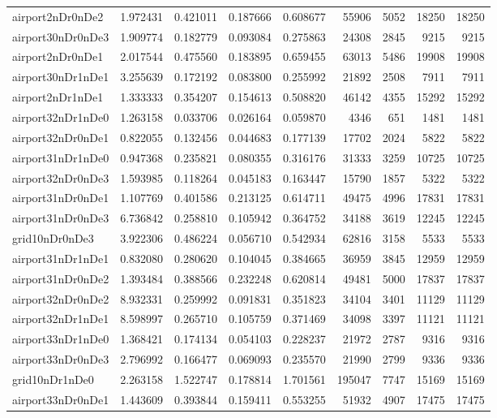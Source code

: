 \documentclass[../../../thesis.tex]{subfiles}
\begin{document}
\begin{longtable}{|l|r|r|r|r|r|r|r|r|}
airport2nDr0nDe2 & 1.972431 & 0.421011 & 0.187666 & 0.608677 & 55906 & 5052 & 18250 & 18250 \\
airport30nDr0nDe3 & 1.909774 & 0.182779 & 0.093084 & 0.275863 & 24308 & 2845 & 9215 & 9215 \\
airport2nDr0nDe1 & 2.017544 & 0.475560 & 0.183895 & 0.659455 & 63013 & 5486 & 19908 & 19908 \\
airport30nDr1nDe1 & 3.255639 & 0.172192 & 0.083800 & 0.255992 & 21892 & 2508 & 7911 & 7911 \\
airport2nDr1nDe1 & 1.333333 & 0.354207 & 0.154613 & 0.508820 & 46142 & 4355 & 15292 & 15292 \\
airport32nDr1nDe0 & 1.263158 & 0.033706 & 0.026164 & 0.059870 & 4346 & 651 & 1481 & 1481 \\
airport32nDr0nDe1 & 0.822055 & 0.132456 & 0.044683 & 0.177139 & 17702 & 2024 & 5822 & 5822 \\
airport31nDr1nDe0 & 0.947368 & 0.235821 & 0.080355 & 0.316176 & 31333 & 3259 & 10725 & 10725 \\
airport32nDr0nDe3 & 1.593985 & 0.118264 & 0.045183 & 0.163447 & 15790 & 1857 & 5322 & 5322 \\
airport31nDr0nDe1 & 1.107769 & 0.401586 & 0.213125 & 0.614711 & 49475 & 4996 & 17831 & 17831 \\
airport31nDr0nDe3 & 6.736842 & 0.258810 & 0.105942 & 0.364752 & 34188 & 3619 & 12245 & 12245 \\
grid10nDr0nDe3 & 3.922306 & 0.486224 & 0.056710 & 0.542934 & 62816 & 3158 & 5533 & 5533 \\
airport31nDr1nDe1 & 0.832080 & 0.280620 & 0.104045 & 0.384665 & 36959 & 3845 & 12959 & 12959 \\
airport31nDr0nDe2 & 1.393484 & 0.388566 & 0.232248 & 0.620814 & 49481 & 5000 & 17837 & 17837 \\
airport32nDr0nDe2 & 8.932331 & 0.259992 & 0.091831 & 0.351823 & 34104 & 3401 & 11129 & 11129 \\
airport32nDr1nDe1 & 8.598997 & 0.265710 & 0.105759 & 0.371469 & 34098 & 3397 & 11121 & 11121 \\
airport33nDr1nDe0 & 1.368421 & 0.174134 & 0.054103 & 0.228237 & 21972 & 2787 & 9316 & 9316 \\
airport33nDr0nDe3 & 2.796992 & 0.166477 & 0.069093 & 0.235570 & 21990 & 2799 & 9336 & 9336 \\
grid10nDr1nDe0 & 2.263158 & 1.522747 & 0.178814 & 1.701561 & 195047 & 7747 & 15169 & 15169 \\
airport33nDr0nDe1 & 1.443609 & 0.393844 & 0.159411 & 0.553255 & 51932 & 4907 & 17475 & 17475 \\

\end{longtable}
\end{document}
